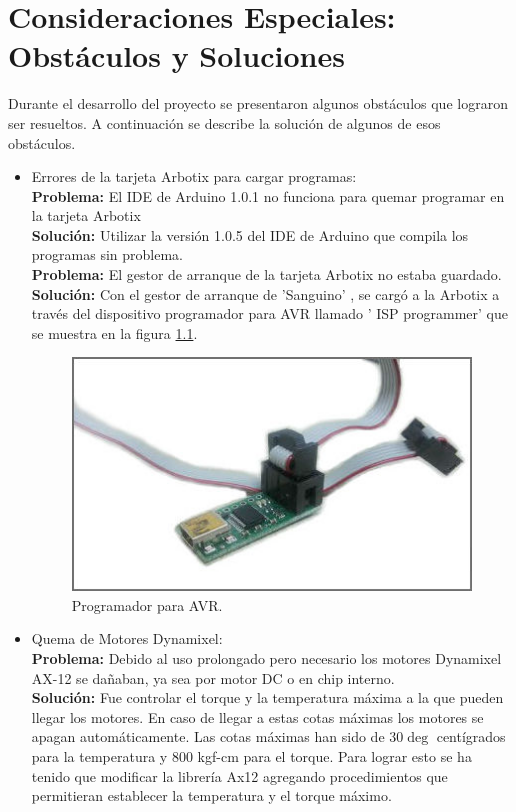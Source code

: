 \chapter{Consideraciones Especiales: Obst\'aculos y Soluciones} \label{chapter:consideraciones}

Durante el desarrollo del proyecto se presentaron algunos obst\'aculos que lograron ser resueltos. A continuación se describe la solución de algunos de esos obstáculos. 
\begin{itemize}
\item Errores de la tarjeta Arbotix para cargar programas:\\
	
	\textbf{Problema:} El IDE de Arduino 1.0.1 no funciona para quemar programar en la tarjeta Arbotix \\
  	\textbf{Soluci\'on:} Utilizar la versión 1.0.5 del IDE de Arduino  que compila los programas sin problema. \\
	

	 \textbf{Problema:} El gestor de arranque de la tarjeta Arbotix no estaba guardado.\\
	 \textbf{Soluci\'on:} Con el gestor de arranque de 'Sanguino' , se cargó a la Arbotix a través del    			    dispositivo programador para AVR llamado ' ISP programmer' que se muestra en la figura         \ref{fig:ISPprog}. 

	\begin{figure}[hbtp]
	\centering
	\includegraphics[scale=0.3]{imagenes/ISP.jpg}
	\caption{Programador para AVR.}
	\label{fig:ISPprog}
	\end{figure}
	
	

 \item Quema de Motores Dynamixel:\\

	\textbf{Problema:} Debido al uso prolongado pero necesario los motores Dynamixel AX-12 se dañaban, ya sea por motor DC o en chip interno.\\
	\textbf{Soluci\'on:} Fue controlar el torque y la temperatura máxima a la que pueden llegar los motores. En caso de llegar a estas cotas máximas los motores se apagan automáticamente. Las cotas máximas han sido de $30\deg$ centígrados para la temperatura y 800 kgf-cm para el torque. Para lograr esto se ha tenido que modificar la librería Ax12 agregando procedimientos que permitieran establecer la temperatura y el torque máximo.\\


\end{itemize}
